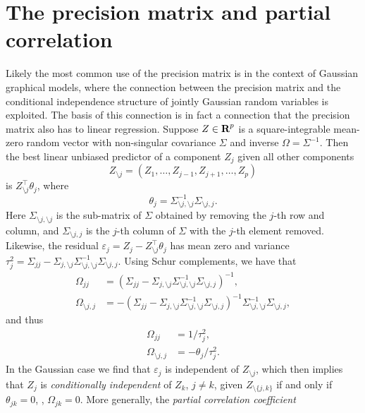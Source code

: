 \documentclass{article}
\begin{document}
\section{The precision matrix and partial correlation}\label{sec:precision-partial-correlation} 

Likely the most common use of the precision matrix is in the context of Gaussian
graphical models, where the connection between the precision matrix and the
conditional independence structure of jointly Gaussian random variables is
exploited. The basis of this connection is in fact a connection that the
precision matrix also has to linear regression. Suppose $Z\in{\mbox{\bf R}}^p$ is a
square-integrable mean-zero random vector with non-singular covariance $\Sigma$
and inverse $\Omega = \Sigma^{-1}$. Then the best linear unbiased predictor of
a component $Z_j$ given all other components
\[
    Z_{\setminus j} = (Z_1, \dots, Z_{j-1}, Z_{j+1}, \dots, Z_p)
\]
is $Z_{\setminus j}^\top \theta_j$, where
\[
    \theta_j = \Sigma_{\setminus j, \setminus j}^{-1} \Sigma_{\setminus j, j}.
\]
Here $\Sigma_{\setminus j, \setminus j}$ is the sub-matrix of $\Sigma$ obtained
by removing the $j$-th row and column, and $\Sigma_{\setminus j, j}$ is the $j$-th
column of $\Sigma$ with the $j$-th element removed. Likewise, the residual
$\varepsilon_j = Z_j - Z_{\setminus j}^\top \theta_j$ has mean zero and
variance $\tau_j^2 = \Sigma_{jj} - \Sigma_{j, \setminus j} \Sigma_{\setminus j,
\setminus j}^{-1} \Sigma_{\setminus j, j}$. Using Schur complements, we have
that
\[
    \begin{aligned}
      \Omega_{jj} &= (\Sigma_{jj} - \Sigma_{j, \setminus j} \Sigma_{\setminus j, \setminus j}^{-1} \Sigma_{\setminus j, j})^{-1}, \\
      \Omega_{\setminus j, j} &= -(\Sigma_{jj} - \Sigma_{j, \setminus j} \Sigma_{\setminus j, \setminus j}^{-1} \Sigma_{\setminus j, j})^{-1} \Sigma_{\setminus j, \setminus j}^{-1} \Sigma_{\setminus j, j},
    \end{aligned}
\]
and thus
\[
    \begin{aligned}
      \Omega_{jj} &= 1 / \tau_j^2, \\
      \Omega_{\setminus j, j} &= -\theta_j / \tau_j^2. 
    \end{aligned}
\]
In the Gaussian case we find that $\varepsilon_j$ is independent of $Z_{\setminus
j}$, which then implies that $Z_j$ is \emph{conditionally independent} of $Z_k$,
$j\neq k$, given $Z_{\setminus \{j, k\}}$ if and only if $\theta_{jk} = 0$, \ie,
$\Omega_{jk} = 0$. More generally, the \emph{partial correlation coefficient}
\end{document}
